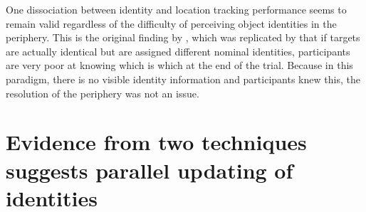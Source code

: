 \documentclass[
]{book}
\begin{document}
One dissociation between identity and location tracking performance seems to remain valid regardless of the difficulty of perceiving object identities in the periphery. This is the original finding by \citet{pylyshynRoleLocationIndexes1989}, which was replicated by \citet{cohenWhatwhereTradeoffMultipleidentity2011} that if targets are actually identical but are assigned different nominal identities, participants are very poor at knowing which is which at the end of the trial. Because in this paradigm, there is no visible identity information and participants knew this, the resolution of the periphery was not an issue.

\hypertarget{evidence-from-two-techniques-suggests-parallel-updating-of-identities}{%
\section{Evidence from two techniques suggests parallel updating of identities}\label{evidence-from-two-techniques-suggests-parallel-updating-of-identities}}
\end{document}
